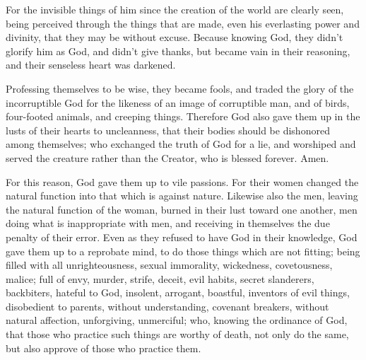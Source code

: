 {For the invisible things of him since the creation of the world are clearly seen, being perceived through the things that are made, even his everlasting power and divinity, that they may be without excuse.
Because knowing God, they didn’t glorify him as God, and didn’t give thanks, but became vain in their reasoning, and their senseless heart was darkened.
\par }{\PP {}Professing themselves to be wise, they became fools,
and traded the glory of the incorruptible God for the likeness of an image of corruptible man, and of birds, four-footed animals, and creeping things.
Therefore God also gave them up in the lusts of their hearts to uncleanness, that their bodies should be dishonored among themselves;
who exchanged the truth of God for a lie, and worshiped and served the creature rather than the Creator, who is blessed forever. Amen.
\par }{\PP {}For this reason, God gave them up to vile passions. For their women changed the natural function into that which is against nature.
Likewise also the men, leaving the natural function of the woman, burned in their lust toward one another, men doing what is inappropriate with men, and receiving in themselves the due penalty of their error.
Even as they refused to have God in their knowledge, God gave them up to a reprobate mind, to do those things which are not fitting;
being filled with all unrighteousness, sexual immorality, wickedness, covetousness, malice; full of envy, murder, strife, deceit, evil habits, secret slanderers,
backbiters, hateful to God, insolent, arrogant, boastful, inventors of evil things, disobedient to parents,
without understanding, covenant breakers, without natural affection, unforgiving, unmerciful;
who, knowing the ordinance of God, that those who practice such things are worthy of death, not only do the same, but also approve of those who practice them.

}

